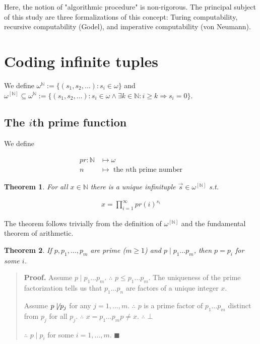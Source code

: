 \documentclass[a4paper, 12pt]{article}
\newtheorem{theorem}{Theorem}
\newtheorem{theorem}{Theorem}
\begin{document}
Here, the notion of "algorithmic procedure" is non-rigorous. The principal
subject of this study are three formalizations of this concept: Turing
computability, recursive computability (Godel), and imperative
computability (von Neumann).

\pagebreak

\section{Coding infinite tuples}

We define $\omega^{\mathbb{N}} := \{ (s_1, s_2, \ldots) : s_i \in \omega \}$ and
$\omega^{\left[ \mathbb{N} \right] } \subseteq \omega^{\mathbb{N}} := \{(s_1,
s_2, \ldots) : s_i \in \omega \land \exists k \in \mathbb{N} : i \geq k
\Rightarrow s_i = 0\}$. 

\subsection{The $i$th prime function}

We define 

\begin{align*}
    pr : \mathbb{N} &\mapsto \omega  \\ 
    n &\mapsto \text{ the $n$th prime number}
\end{align*}

\begin{theorem}
    For all $x \in \mathbb{N}$ there is a unique infinituple $\overrightarrow{s}
    \in \omega^{[\mathbb{N}]}$ s.t. 

    \begin{align*}
        x = \prod_{i=1}^{\infty} pr(i)^{s_i}
    \end{align*}
\end{theorem}

The theorem follows trivially from the definition of $\omega^{[\mathbb{N}]}$ and
the fundamental theorem of arithmetic. 



\begin{theorem}
    If $p, p_1, \ldots, p_m$ are prime ($m \geq 1$) and $p \mid p_1 \ldots p_m$,
    then $p = p_i$ for some $i$.
\end{theorem}


\small
\begin{quote}

\textbf{Proof.} Assume $p \mid p_1 \ldots p_m$. $\therefore $ $p \leq p_1 \ldots
p_m$. The uniqueness of the prime factorization tells us that $p_1 \ldots p_n
$ are factors of a unique integer $x$.

Assume $p \not\mid p_j$ for any $j = 1, \ldots, m$. $\therefore $ $p$ is a prime
factor of $p_1 \ldots p_m$ distinct from $p_j$ for all $p_j$. $\therefore $ $x = p_1
\ldots p_m p \neq x$. $\therefore $  $\bot$

$\therefore $ $p \mid p_i$ for some $i = 1, \ldots, m$. $\blacksquare$

\end{quote}
\normalsize
\end{document}
